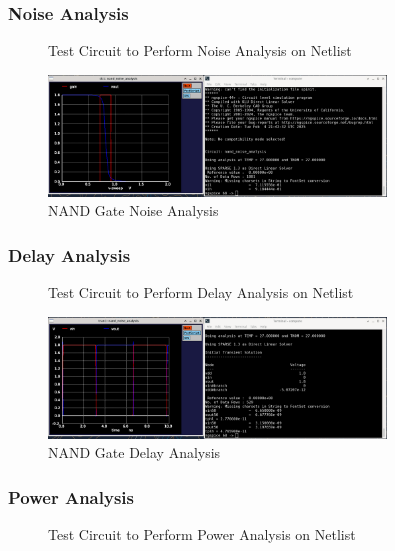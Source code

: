 \documentclass{article}
\begin{document}
	\subsubsection{Noise Analysis}
	\begin{figure}[H]
		
		\caption{Test Circuit to Perform Noise Analysis on Netlist}
		\label{fig::nand_noise_analysis_test_circuit}
	\end{figure}
	
	\begin{figure}[H]
		\centerline{\includegraphics[width=0.8\textwidth]{nand_noise_analysis.png}}
		\caption{NAND Gate Noise Analysis}
		\label{fig::nand_noise_analysis}
	\end{figure}
	
	\subsubsection{Delay Analysis}
	\begin{figure}[H]
		
		\caption{Test Circuit to Perform Delay Analysis on Netlist}
		\label{fig::nand_delay_analysis_test_circuit}
	\end{figure}
	
	\begin{figure}[H]
		\centerline{\includegraphics[width=0.8\textwidth]{nand_delay_analysis.png}}
		\caption{NAND Gate Delay Analysis}
		\label{fig::nand_delay_analysis}
	\end{figure}
	
	\subsubsection{Power Analysis}
	\begin{figure}[H]
		
		\caption{Test Circuit to Perform Power Analysis on Netlist}
		\label{fig::nand_power_analysis_test_circuit}
	\end{figure}
	
\end{document}

